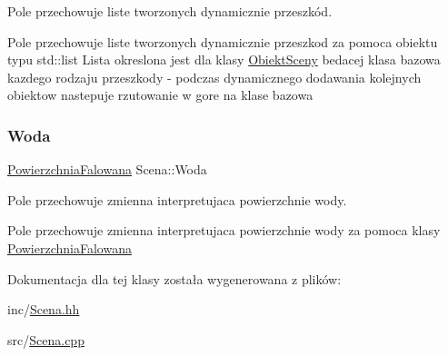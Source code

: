 Pole przechowuje liste tworzonych dynamicznie przeszkód. 

Pole przechowuje liste tworzonych dynamicznie przeszkod za pomoca obiektu typu std\+::list Lista okreslona jest dla klasy \hyperlink{classObiektSceny}{Obiekt\+Sceny} bedacej klasa bazowa kazdego rodzaju przeszkody -\/ podczas dynamicznego dodawania kolejnych obiektow nastepuje rzutowanie w gore na klase bazowa \mbox{\label{classScena_a6053a6a241f17e12f47717a73d0988d6}} 
\subsubsection{\texorpdfstring{Woda}{Woda}}
{\footnotesize\ttfamily \hyperlink{classPowierzchniaFalowana}{Powierzchnia\+Falowana} Scena\+::\+Woda\hspace{0.3cm}{\ttfamily [private]}}



Pole przechowuje zmienna interpretujaca powierzchnie wody. 

Pole przechowuje zmienna interpretujaca powierzchnie wody za pomoca klasy \hyperlink{classPowierzchniaFalowana}{Powierzchnia\+Falowana} 

Dokumentacja dla tej klasy została wygenerowana z plików\+:\begin{DoxyCompactItemize}
\item 
inc/\hyperlink{Scena_8hh}{Scena.\+hh}\item 
src/\hyperlink{Scena_8cpp}{Scena.\+cpp}\end{DoxyCompactItemize}
